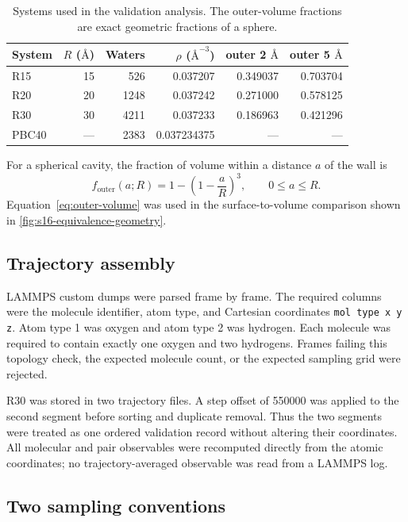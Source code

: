 \documentclass[11pt]{article}
\newcommand{\angstrom}{\text{\AA}}
\begin{document}
\begin{table}[htbp]
\centering
\caption{Systems used in the validation analysis.  The outer-volume
fractions are exact geometric fractions of a sphere.}
\label{tab:systems}
\begin{tabular}{lrrrrr}
\toprule
System & \(R\) (\(\angstrom\)) & Waters & \(\rho\) (\(\angstrom^{-3}\))
& outer 2 \(\angstrom\) & outer 5 \(\angstrom\) \\
\midrule
R15 & 15 & 526  & 0.037207 & 0.349037 & 0.703704 \\
R20 & 20 & 1248 & 0.037242 & 0.271000 & 0.578125 \\
R30 & 30 & 4211 & 0.037233 & 0.186963 & 0.421296 \\
PBC40 & --- & 2383 & 0.037234375 & --- & --- \\
\bottomrule
\end{tabular}
\end{table}

For a spherical cavity, the fraction of volume within a distance \(a\) of
the wall is
\begin{equation}
 f_{\mathrm{outer}}(a;R)
 = 1-\left(1-\frac{a}{R}\right)^3,
 \qquad 0\leq a\leq R.
 \label{eq:outer-volume}
\end{equation}
Equation~\eqref{eq:outer-volume} was used in the surface-to-volume comparison
shown in \cref{fig:s16-equivalence-geometry}.

\subsection{Trajectory assembly}

LAMMPS custom dumps were parsed frame by frame.  The required columns were
the molecule identifier, atom type, and Cartesian coordinates
\texttt{mol type x y z}.  Atom type 1 was oxygen and atom type 2 was
hydrogen.  Each molecule was required to contain exactly one oxygen and two
hydrogens.  Frames failing this topology check, the expected molecule count,
or the expected sampling grid were rejected.

R30 was stored in two trajectory files.  A step offset of 550000 was applied
to the second segment before sorting and duplicate removal.  Thus the two
segments were treated as one ordered validation record without altering their
coordinates.  All molecular and pair observables were recomputed directly
from the atomic coordinates; no trajectory-averaged observable was read from
a LAMMPS log.

\subsection{Two sampling conventions}
\end{document}
